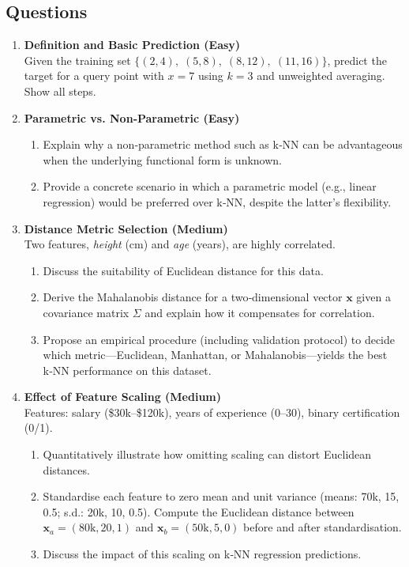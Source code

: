 \documentclass[12pt, a4paper]{article}
\begin{document}
\subsection{Questions}
\begin{enumerate}
  \item \textbf{Definition and Basic Prediction (Easy)}\\
    Given the training set \(\{(2,4),\;(5,8),\;(8,12),\;(11,16)\}\), predict the target for a query point with \(x=7\) using \(k=3\) and unweighted averaging. Show all steps.

  \item \textbf{Parametric vs. Non‑Parametric (Easy)}\\
    \begin{enumerate}[label=\alph)]
      \item Explain why a non‑parametric method such as k‑NN can be advantageous when the underlying functional form is unknown.
      \item Provide a concrete scenario in which a parametric model (e.g., linear regression) would be preferred over k‑NN, despite the latter’s flexibility.
    \end{enumerate}

  \item \textbf{Distance Metric Selection (Medium)}\\
    Two features, \emph{height} (cm) and \emph{age} (years), are highly correlated.
    \begin{enumerate}[label=\alph)]
      \item Discuss the suitability of Euclidean distance for this data.
      \item Derive the Mahalanobis distance for a two‑dimensional vector \(\mathbf{x}\) given a covariance matrix \(\Sigma\) and explain how it compensates for correlation.
      \item Propose an empirical procedure (including validation protocol) to decide which metric—Euclidean, Manhattan, or Mahalanobis—yields the best k‑NN performance on this dataset.
    \end{enumerate}

  \item \textbf{Effect of Feature Scaling (Medium)}\\
    Features: salary (\$30k–\$120k), years of experience (0–30), binary certification (0/1).  
    \begin{enumerate}[label=\alph)]
      \item Quantitatively illustrate how omitting scaling can distort Euclidean distances.
      \item Standardise each feature to zero mean and unit variance (means: 70k, 15, 0.5; s.d.: 20k, 10, 0.5). Compute the Euclidean distance between \(\mathbf{x}_a=(80\text{k},20,1)\) and \(\mathbf{x}_b=(50\text{k},5,0)\) before and after standardisation.
      \item Discuss the impact of this scaling on k‑NN regression predictions.
    \end{enumerate}


\end{enumerate}
\end{document}
